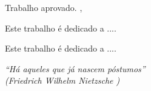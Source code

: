 \documentclass[12pt]{abntex2}
\renewcommand{\imprimircapa}{%
\begin{capa}%
\center
\imprimirinstituicao
\vspace*{1cm}

\par
\imprimirautor
\vfill

\begin{center}
\bfseries\imprimirtitulo
\end{center}
\vfill
\textsc{\imprimirlocal}
\large
\par   

\imprimirdata
\vspace*{1cm}
\end{capa}
}
\begin{document}
\imprimircapa

\imprimirfolhaderosto

\begin{folhadeaprovacao}
\begin{center}

\imprimirautor
\par
\vspace*{1cm}
{\bfseries\imprimirtitulo}
\par
\vspace*{1cm}
\end{center}

\hspace{.45\textwidth} \begin{minipage}{.5\textwidth}
\imprimirpreambulo
\end{minipage}

Trabalho aprovado. \imprimirlocal, \imprimirdata

\begin{center}
\vspace*{0.5cm}
{\large\imprimirlocal}
\par {\large\imprimirdata}
\vspace*{1cm}
\end{center}



\end{folhadeaprovacao}


\begin{dedicatoria}
\vspace*{\fill}
Este trabalho é dedicado a ....
\vspace*{\fill}
\end{dedicatoria}


\begin{agradecimentos}

Este trabalho é dedicado a ....

\end{agradecimentos}


\begin{epigrafe}

\vspace*{\fill}
\begin{flushright}
\textit{``Há aqueles que já nascem póstumos''\\ (Friedrich Wilhelm Nietzsche )}
\end{flushright}

\end{epigrafe}
\end{document}
